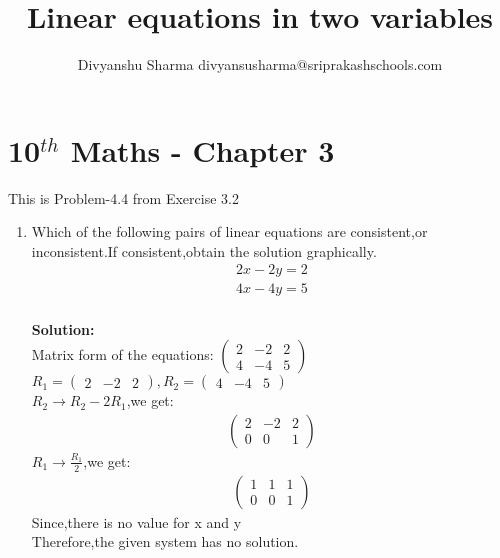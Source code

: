 \documentclass[12pt]{article}
\title{Linear equations in two variables}
\author{Divyanshu Sharma {divyansusharma@sriprakashschools.com}}
\newcommand{\myvec}[1]{\ensuremath{\begin{pmatrix}#1\end{pmatrix}}}
\newcommand{\solution}{\noindent \textbf{Solution: }}
\begin{document}
\maketitle
\section*{10$^{th}$ Maths - Chapter 3}
This is Problem-4.4 from Exercise 3.2
\begin{enumerate}
\item Which of the following pairs of linear equations are consistent,or inconsistent.If consistent,obtain the solution graphically.\\
\begin{align}
2x-2y=2\\
4x-4y=5\\
\end{align}

\solution \\
Matrix form of the equations:
$\myvec{2 & -2 & 2\\4 & -4 & 5}$\\
$R_1=\myvec{2 & -2 & 2},R_2=\myvec{4 & -4 & 5}$\\
$R_2\rightarrow R_2 - 2R_1$,we get:
\begin{align}
\myvec{2 & -2 & 2\\0 & 0 & 1}
\end{align}
$R_1\rightarrow \frac{R_1}{2}$,we get:
\begin{align}
\myvec{1 & 1 & 1\\0 & 0 & 1}
\end{align}
Since,there is no value for x and y
\\Therefore,the given system has no solution.
\end{enumerate}
\end{document}
